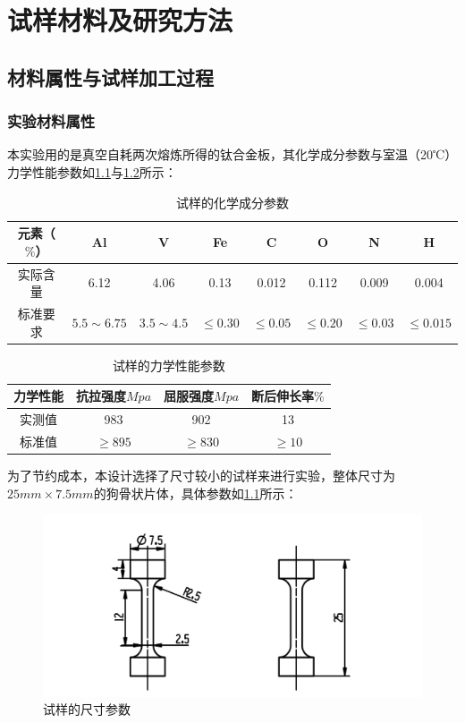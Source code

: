 \chapter{试样材料及研究方法}
\section{材料属性与试样加工过程}
\subsection{实验材料属性}
本实验用的是真空自耗两次熔炼所得的钛合金板，其化学成分参数与室温（20℃）力学性能参数如\ref{sec:mytc4chem}与\ref{sec:mytc4machin}所示：
\begin{table}[htbp]
	\centering
	\caption{试样的化学成分参数}
	\label{sec:mytc4chem}
	\begin{tabular}{cccccccc}
		\toprule
		元素（$ \% $） & Al & V &Fe &C& O& N &H \\ \midrule
		实际含量 & 6.12&4.06 &0.13 &0.012&0.112&0.009&0.004  \\
		标准要求 &$ 5.5\sim 6.75 $ & $ 3.5\sim 4.5 $&$ \le 0.30 $ & $ \le 0.05 $&$ \le 0.20 $&$ \le 0.03$ &$ \le 0.015 $ \\ \bottomrule
	\end{tabular}
\end{table}
\begin{table}[htbp]
	\centering
	\caption{试样的力学性能参数}
	\label{sec:mytc4machin}
	\begin{tabular}{cccc}
		\toprule
		力学性能& 抗拉强度$Mpa  $& 屈服强度$ Mpa $&断后伸长率$ \% $\\ \midrule
		实测值 & 983 &902 & 13\\
		标准值 &$ \ge 895 $&$ \ge 830 $&$ \ge 10 $ \\ \bottomrule
	\end{tabular}
\end{table}

为了节约成本，本设计选择了尺寸较小的试样来进行实验，整体尺寸为$ 25mm\times 7.5mm $的狗骨状片体，具体参数如\ref{fig:试样尺寸}所示：

\begin{figure}[h!]
	\centering
	\includegraphics[width=0.99\linewidth]{pic/试样}
	\caption{试样的尺寸参数}
	\label{fig:试样尺寸}
\end{figure}

